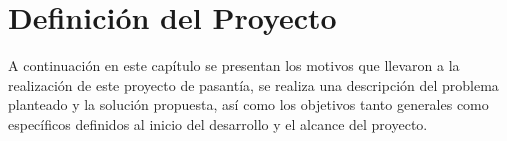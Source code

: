 \chapter{Definición del Proyecto} \label{chap:definicion_proyecto}

\vspace{5 mm}

A continuación en este capítulo se presentan los motivos que llevaron a la realización de este proyecto de pasantía, se realiza una descripción del problema planteado y la solución propuesta, así como los objetivos tanto generales como específicos definidos al inicio del desarrollo y el alcance del proyecto.